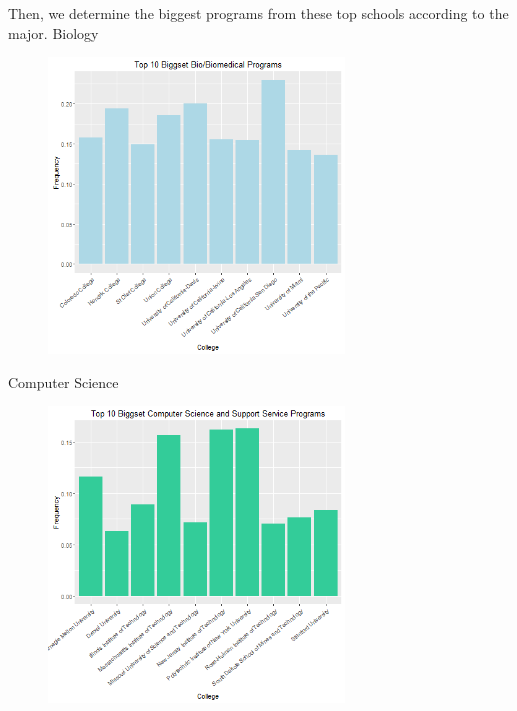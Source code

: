 \documentclass{article}
\begin{document}
Then, we determine the biggest programs from these top schools according to the major. 
Biology 
\begin{figure}[H]
\includegraphics[width=0.7\textwidth]{../images/biggestBio.png}
\end{figure}


Computer Science
\begin{figure}[H]
\includegraphics[width=0.7\textwidth]{../images/biggestCS.png}
\end{figure}
\end{document}
